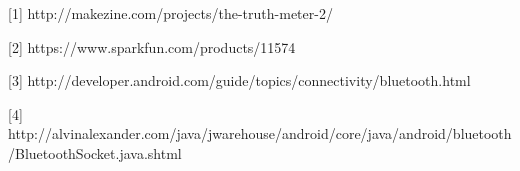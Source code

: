 \documentclass[finalProposal.tex]{subfiles}
\begin{document}
\onehalfspacing


\bigskip

[1] http://makezine.com/projects/the-truth-meter-2/ 

[2] https://www.sparkfun.com/products/11574

[3] http://developer.android.com/guide/topics/connectivity/bluetooth.html

[4] http://alvinalexander.com/java/jwarehouse/android/core/java/android/bluetooth/BluetoothSocket.java.shtml
\end{document}
